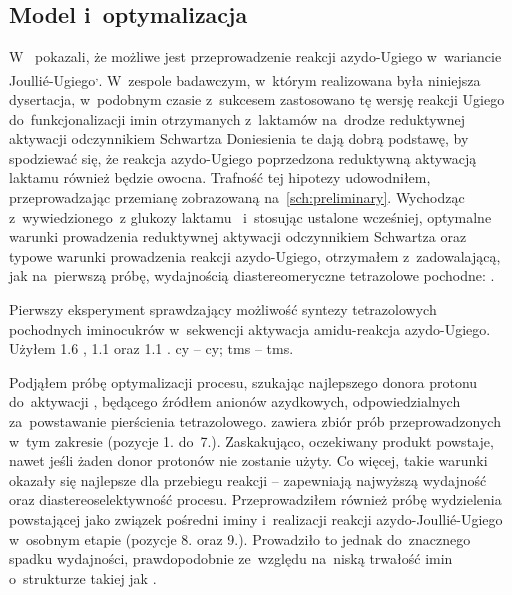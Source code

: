 \subsection{Model i~optymalizacja}
W~\citeyear{nenajdenko13} \citeauthor{nenajdenko13} pokazali, że możliwe jest przeprowadzenie
  reakcji azydo-Ugiego w~wariancie Joulli{\'e}-Ugiego\textsuperscript{,\thinspace}.
W~zespole badawczym, w~którym realizowana była niniejsza dysertacja, w~podobnym czasie
  z~sukcesem zastosowano tę wersję reakcji Ugiego do~funkcjonalizacji imin otrzymanych
  z~laktamów na~drodze reduktywnej aktywacji odczynnikiem Schwartza
Doniesienia te dają dobrą podstawę, by spodziewać się, że reakcja azydo-Ugiego poprzedzona
  reduktywną aktywacją laktamu również będzie owocna.
Trafność tej hipotezy udowodniłem, przeprowadzając przemianę zobrazowaną na~\cref{sch:preliminary}.
Wychodząc z~wywiedzionego~z glukozy laktamu~ i~stosując ustalone wcześniej,
  optymalne warunki prowadzenia reduktywnej aktywacji odczynnikiem Schwartza
  oraz typowe warunki prowadzenia reakcji azydo-Ugiego,
  otrzymałem z~zadowalającą, jak na~pierwszą próbę, wydajnością diastereomeryczne tetrazolowe
  pochodne: .
\begin{scheme*}
  
  \caption{
    Pierwszy eksperyment sprawdzający możliwość syntezy tetrazolowych pochodnych iminocukrów
      w~sekwencji aktywacja amidu\--reakcja azydo-Ugiego.
    Użyłem \SI{1.6}{\equiv} \schwartz{}, \SI{1.1}{\equiv}  oraz
      \SI{1.1}{\equiv} .
    \acrshort{cy} \--- \acrlong{cy}; \acrshort{tms} \--- \acrlong{tms}.
  }
  \label{sch:preliminary}
\end{scheme*}

Podjąłem próbę optymalizacji procesu, szukając najlepszego donora protonu do~aktywacji ,
  będącego źródłem anionów azydkowych, odpowiedzialnych za~powstawanie pierścienia tetrazolowego.
 zawiera zbiór prób przeprowadzonych w~tym zakresie (pozycje 1. do~7.).
Zaskakująco, oczekiwany produkt powstaje, nawet jeśli żaden donor protonów nie zostanie użyty.
Co więcej, takie warunki okazały się najlepsze dla przebiegu reakcji \--- zapewniają najwyższą
  wydajność oraz diastereoselektywność procesu.
Przeprowadziłem również próbę wydzielenia powstającej jako związek pośredni iminy i~realizacji
  reakcji azydo-Joulli{\'e}-Ugiego w~osobnym etapie (pozycje 8. oraz 9.).
Prowadziło to jednak do~znacznego spadku wydajności, prawdopodobnie ze~względu na~niską trwałość
  imin o~strukturze takiej jak .

